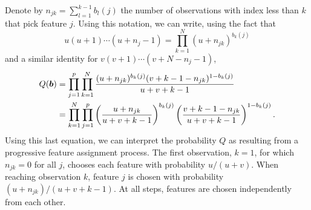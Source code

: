 Denote by $n_{jk} = \sum_{l=1}^{k-1} b_l(j)$ the number of observations with index less than $k$ that pick feature $j$. Using this notation, we can write, using the fact that
\[
u(u+1) \cdots (u+n_j-1) = \prod_{k=1}^N(u+n_{jk})^{b_k(j)}
\]
and a similar identity for  $v(v+1)\cdots(v+N-n_j-1)$, 
\begin{align*}
Q({\bm{b}}) &= \prod_{j=1}^p \prod_{k=1}^N \frac{(u + n_{jk})^{b_k(j)} (v+k-1-n_{jk})^{1-b_k(j)}}{u+v+k-1}\\
&= \prod_{k=1}^N \prod_{j=1}^p \left(\frac{u + n_{jk}}{u+v+k-1}\right)^{b_k(j)} \left(\frac{v+k-1-n_{jk}}{u+v+k-1}\right)^{1-b_k(j)}.
\end{align*}
Using this last equation, we can interpret the probability $Q$ as resulting from a progressive feature assignment process. The first observation, $k=1$, for which $n_{jk} = 0$ for all $j$, chooses each feature with probability $u/(u+v)$. When reaching observation $k$, feature $j$ is chosen with probability $(u+n_{jk})/(u+v+k-1)$. At all steps, features are chosen independently from each other.



